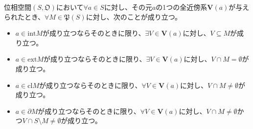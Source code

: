 \documentclass[dvipdfmx]{jsarticle}
\begin{document}
\begin{thm}\label{8.1.1.26}
位相空間$\left( S,\mathfrak{O} \right)$において$\forall a \in S$に対し、その元$a$の1つの全近傍系$\mathbf{V}(a)$が与えられたとき、$\forall M \in \mathfrak{P}(S)$に対し、次のことが成り立つ。
\begin{itemize}
\item
  $a \in {\mathrm{int}}M$が成り立つならそのときに限り、$\exists V \in \mathbf{V}(a)$に対し、$V \subseteq M$が成り立つ。
\item
  $a \in {\mathrm{ext}}M$が成り立つならそのときに限り、$\exists V \in \mathbf{V}(a)$に対し、$V \cap M = \emptyset$が成り立つ。
\item
  $a \in {\mathrm{cl}}M$が成り立つならそのときに限り、$\forall V \in \mathbf{V}(a)$に対し、$V \cap M \neq \emptyset$が成り立つ。
\item
  $a \in \partial M$が成り立つならそのときに限り、$\forall V \in \mathbf{V}(a)$に対し、$V \cap M \neq \emptyset$かつ$V \cap S \setminus M \neq \emptyset$が成り立つ。
\end{itemize}
\end{thm}
\end{document}
